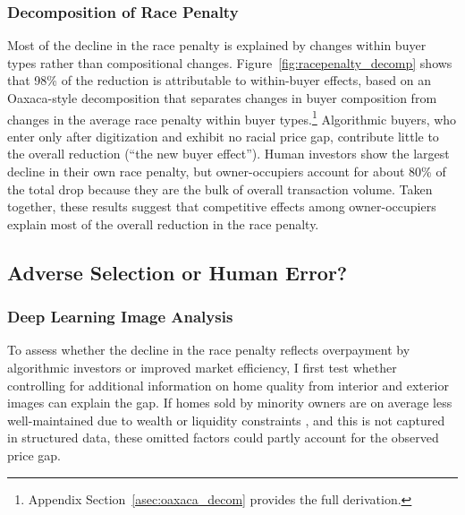 \documentclass[11pt]{article}
\begin{document}
\subsubsection{Decomposition of Race Penalty}
Most of the decline in the race penalty is explained by changes within buyer types rather than compositional changes. Figure~\ref{fig:racepenalty_decomp} shows that 98\% of the reduction is attributable to within-buyer effects, based on an Oaxaca-style decomposition that separates changes in buyer composition from changes in the average race penalty within buyer types.\footnote{Appendix Section~\ref{asec:oaxaca_decom} provides the full derivation.} Algorithmic buyers, who enter only after digitization and exhibit no racial price gap, contribute little to the overall reduction (``the new buyer effect''). Human investors show the largest decline in their own race penalty, but owner-occupiers account for about 80\% of the total drop because they are the bulk of overall transaction volume. Taken together, these results suggest that competitive effects among owner-occupiers explain most of the overall reduction in the race penalty.

\subsection{Adverse Selection or Human Error?}



\subsubsection{Deep Learning Image Analysis} \label{sec:deeplearn}
To assess whether the decline in the race penalty reflects overpayment by algorithmic investors or improved market efficiency, I first test whether controlling for additional information on home quality from interior and exterior images can explain the gap. If homes sold by minority owners are on average less well-maintained due to wealth or liquidity constraints \citep{harris1999}, and this is not captured in structured data, these omitted factors could partly account for the observed price gap.
\end{document}
